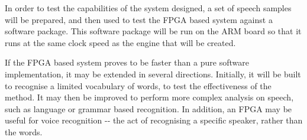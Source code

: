 In order to test the capabilities of the system designed, a set of speech samples will be prepared, and then used to test the FPGA based system against a software package. This software package will be run on the ARM board so that it runs at the same clock speed as the engine that will be created.

If the FPGA based system proves to be faster than a pure software implementation, it may be extended in several directions. Initially, it will be built to recognise a limited vocabulary of words, to test the effectiveness of the method. It may then be improved to perform more complex analysis on speech, such as language or grammar based recognition. In addition, an FPGA may be useful for voice recognition -­‐ the act of recognising a specific speaker, rather than the words.